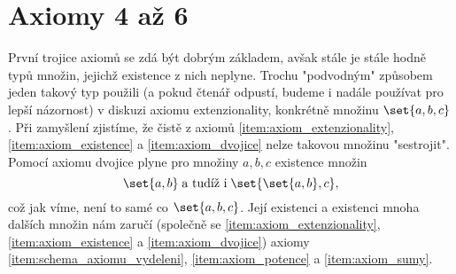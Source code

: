 \section{Axiomy 4 až 6}\label{sec:axiomy_4_az_6}
První trojice axiomů se zdá být dobrým základem, avšak stále je stále hodně typů množin, jejichž existence z nich neplyne. Trochu "podvodným" způsobem jeden takový typ použili (a pokud čtenář odpustí, budeme i nadále používat pro lepší názornost) v diskuzi axiomu extenzionality, konkrétně množinu $\set{a,b,c}$. Při zamyšlení zjistíme, že čistě z axiomů \ref{item:axiom_extenzionality}, \ref{item:axiom_existence} a \ref{item:axiom_dvojice} nelze takovou množinu "sestrojit". Pomocí axiomu dvojice plyne pro množiny $a,b,c$ existence množin
\begin{equation*}
    \set{a,b}\;\text{a tudíž i}\;\set{\set{a,b},c},
\end{equation*}
což jak víme, není to samé co $\set{a,b,c}$. Její existenci a existenci mnoha dalších množin nám zaručí (společně se \ref{item:axiom_extenzionality}, \ref{item:axiom_existence} a \ref{item:axiom_dvojice}) axiomy \ref{item:schema_axiomu_vydeleni}, \ref{item:axiom_potence} a \ref{item:axiom_sumy}.

